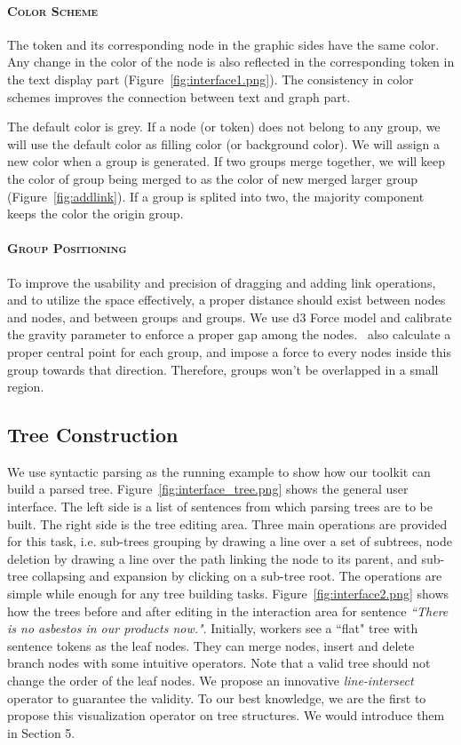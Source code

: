 \paragraph{\textsc{Color Scheme}\\}
The token and its corresponding node in the graphic sides have the same color. Any change in the color of the node is also reflected in the corresponding token in the text display part (Figure~\ref{fig:interface1.png}). The consistency in color schemes improves the connection between text and graph part.

The default color is grey. If a node (or token) does not belong to any group, we will use the default color as filling color (or background color). We will assign a new color when a group is generated. If two groups merge together, we will keep the color of group being merged to as the color of new merged larger group (Figure~\ref{fig:addlink}). If a group is splited into two, the majority component keeps the color the origin group. 

\paragraph{\textsc{Group Positioning}\\}
To improve the usability and precision of dragging and adding link operations, and to utilize the space effectively, a proper distance should exist between nodes and nodes, and between groups and groups. We use d3 Force model and calibrate the gravity parameter to enforce a proper gap among the nodes. \sys\ also calculate a proper central point for each group, and impose a force to every nodes inside this group towards that direction. Therefore, groups won't be overlapped in a small region.

\subsection{Tree Construction}

We use syntactic parsing as the running example to show how our
toolkit can build a parsed tree. Figure~\ref{fig:interface_tree.png}
shows the general user interface. The left side is a list of sentences
from which parsing trees are to be built. The right side is the
tree editing area. Three main operations are provided for this task,
i.e. sub-trees grouping by drawing a line over a set of subtrees, node
deletion by drawing a line over the path linking the node to its
parent, and sub-tree collapsing and expansion by clicking on a
sub-tree root. The operations are simple while enough for any tree
building tasks. Figure~\ref{fig:interface2.png} shows how the
trees before and after editing in the interaction area for sentence
{\em ``There is no asbestos in our products now."}. Initially, workers
see a ``flat" tree with sentence tokens as the leaf nodes. They can
merge nodes, insert and delete branch nodes with some intuitive
operators. Note that a valid tree should not change the order of the
leaf nodes. We propose an innovative {\em line-intersect} operator to
guarantee the validity. To our best knowledge, we are the first to
propose this visualization operator on tree structures. We would
introduce them in Section 5.

